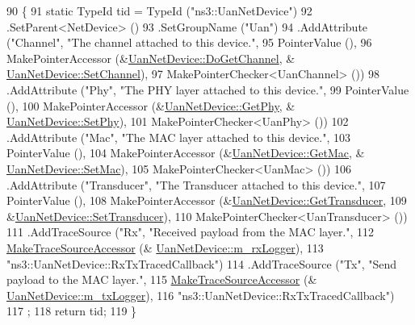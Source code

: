 \begin{DoxyCode}
90 \{
91   \textcolor{keyword}{static} TypeId tid = TypeId (\textcolor{stringliteral}{"ns3::UanNetDevice"})
92     .SetParent<NetDevice> ()
93     .SetGroupName (\textcolor{stringliteral}{"Uan"})
94     .AddAttribute (\textcolor{stringliteral}{"Channel"}, \textcolor{stringliteral}{"The channel attached to this device."},
95                    PointerValue (),
96                    MakePointerAccessor (&\hyperlink{classns3_1_1UanNetDevice_a9bd7ab08d599a1781c7a36826777f623}{UanNetDevice::DoGetChannel}, &
      \hyperlink{classns3_1_1UanNetDevice_a987daa8c043146fad8975cb43fbb24e5}{UanNetDevice::SetChannel}),
97                    MakePointerChecker<UanChannel> ())
98     .AddAttribute (\textcolor{stringliteral}{"Phy"}, \textcolor{stringliteral}{"The PHY layer attached to this device."},
99                    PointerValue (),
100                    MakePointerAccessor (&\hyperlink{classns3_1_1UanNetDevice_abff3efdff8f4c31c2bb0ea780a6b99a8}{UanNetDevice::GetPhy}, &
      \hyperlink{classns3_1_1UanNetDevice_af6d039ecff08a8f794738fd62956f917}{UanNetDevice::SetPhy}),
101                    MakePointerChecker<UanPhy> ())
102     .AddAttribute (\textcolor{stringliteral}{"Mac"}, \textcolor{stringliteral}{"The MAC layer attached to this device."},
103                    PointerValue (),
104                    MakePointerAccessor (&\hyperlink{classns3_1_1UanNetDevice_adb4ad57f640b285d238687713c9826b3}{UanNetDevice::GetMac}, &
      \hyperlink{classns3_1_1UanNetDevice_a7225cfda064ecc308e224eb1b11397b5}{UanNetDevice::SetMac}),
105                    MakePointerChecker<UanMac> ())
106     .AddAttribute (\textcolor{stringliteral}{"Transducer"}, \textcolor{stringliteral}{"The Transducer attached to this device."},
107                    PointerValue (),
108                    MakePointerAccessor (&\hyperlink{classns3_1_1UanNetDevice_a28fd8d3e52558859abd0757f48e8d478}{UanNetDevice::GetTransducer},
109                                         &\hyperlink{classns3_1_1UanNetDevice_ad91b46a001ee99241d7579800f93eab5}{UanNetDevice::SetTransducer}),
110                    MakePointerChecker<UanTransducer> ())
111     .AddTraceSource (\textcolor{stringliteral}{"Rx"}, \textcolor{stringliteral}{"Received payload from the MAC layer."},
112                      \hyperlink{group__tracing_gab21a770b9855af4e8f69f7531ea4a6b0}{MakeTraceSourceAccessor} (&
      \hyperlink{classns3_1_1UanNetDevice_a427c15bb70e38facb1c50fe76bfe1979}{UanNetDevice::m\_rxLogger}),
113                      \textcolor{stringliteral}{"ns3::UanNetDevice::RxTxTracedCallback"})
114     .AddTraceSource (\textcolor{stringliteral}{"Tx"}, \textcolor{stringliteral}{"Send payload to the MAC layer."},
115                      \hyperlink{group__tracing_gab21a770b9855af4e8f69f7531ea4a6b0}{MakeTraceSourceAccessor} (&
      \hyperlink{classns3_1_1UanNetDevice_ab1ed35043886ee497c4ea96267c50b79}{UanNetDevice::m\_txLogger}),
116                      \textcolor{stringliteral}{"ns3::UanNetDevice::RxTxTracedCallback"})
117   ;
118   \textcolor{keywordflow}{return} tid;
119 \}
\end{DoxyCode}


